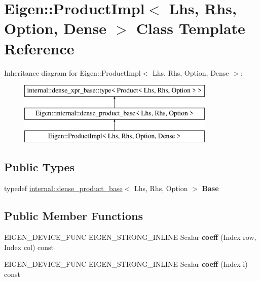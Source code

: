 \hypertarget{class_eigen_1_1_product_impl_3_01_lhs_00_01_rhs_00_01_option_00_01_dense_01_4}{}\section{Eigen\+::Product\+Impl$<$ Lhs, Rhs, Option, Dense $>$ Class Template Reference}
\label{class_eigen_1_1_product_impl_3_01_lhs_00_01_rhs_00_01_option_00_01_dense_01_4}
Inheritance diagram for Eigen\+::Product\+Impl$<$ Lhs, Rhs, Option, Dense $>$\+:\begin{figure}[H]
\begin{center}
\leavevmode
\includegraphics[height=3.000000cm]{class_eigen_1_1_product_impl_3_01_lhs_00_01_rhs_00_01_option_00_01_dense_01_4}
\end{center}
\end{figure}
\subsection*{Public Types}
\begin{DoxyCompactItemize}
\item 
\mbox{\label{class_eigen_1_1_product_impl_3_01_lhs_00_01_rhs_00_01_option_00_01_dense_01_4_ab67d2631482379025bfbf302f46f1b78}} 
typedef \mbox{\hyperlink{class_eigen_1_1internal_1_1dense__product__base}{internal\+::dense\+\_\+product\+\_\+base}}$<$ Lhs, Rhs, Option $>$ {\bfseries Base}
\end{DoxyCompactItemize}
\subsection*{Public Member Functions}
\begin{DoxyCompactItemize}
\item 
\mbox{\label{class_eigen_1_1_product_impl_3_01_lhs_00_01_rhs_00_01_option_00_01_dense_01_4_a61071944f0f2ebe4790b8e415e7f0089}} 
E\+I\+G\+E\+N\+\_\+\+D\+E\+V\+I\+C\+E\+\_\+\+F\+U\+NC E\+I\+G\+E\+N\+\_\+\+S\+T\+R\+O\+N\+G\+\_\+\+I\+N\+L\+I\+NE Scalar {\bfseries coeff} (Index row, Index col) const
\item 
\mbox{\label{class_eigen_1_1_product_impl_3_01_lhs_00_01_rhs_00_01_option_00_01_dense_01_4_a28b544596b8dfeeaf47b7566e5de01e4}} 
E\+I\+G\+E\+N\+\_\+\+D\+E\+V\+I\+C\+E\+\_\+\+F\+U\+NC E\+I\+G\+E\+N\+\_\+\+S\+T\+R\+O\+N\+G\+\_\+\+I\+N\+L\+I\+NE Scalar {\bfseries coeff} (Index i) const
\end{DoxyCompactItemize}
